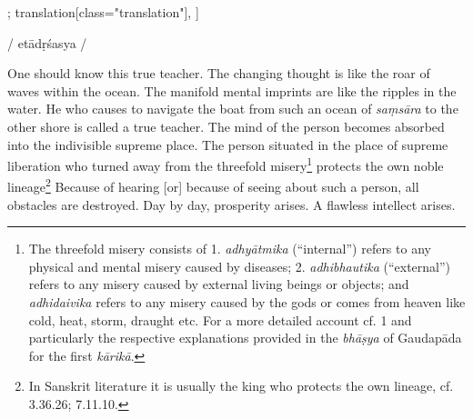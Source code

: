 \begin{alignment}[
  texts=edition[class="edition"];
  translation[class="translation"],
  ]
\begin{edition}
\begin{prose}[p58_01]
{  }
/
etādṛśasya
/
\end{prose}
  \end{edition}
  \begin{translation}
    \begin{tlate}[p57_04]
      \noindent
One should know this true teacher. The changing thought is like the roar of waves within the ocean. The manifold mental imprints are like the ripples in the water. He who causes to navigate the boat from such an ocean of \textit{saṃsāra} to the other shore is called a true teacher. The mind of the person becomes absorbed into the indivisible supreme place. The person situated in the place of supreme liberation who turned away from the threefold misery\footnote{The threefold misery consists of 1. \textit{adhyātmika} (``internal'') refers to any physical and mental misery caused by diseases; 2. \textit{adhibhautika} (``external'') refers to any misery caused by external living beings or objects; and \textit{adhidaivika} refers to any misery caused by the gods or comes from heaven like cold, heat, storm, draught etc. For a more detailed account cf.  1 and particularly the respective explanations provided in the \textit{bhāṣya} of Gaudapāda for the first \textit{kārikā}.} protects the own noble lineage\footnote{In Sanskrit literature it is usually the king who protects the own lineage, cf.  3.36.26;  7.11.10.} Because of hearing [or] because of seeing about such a person, all obstacles are destroyed. Day by day, prosperity arises. A flawless intellect arises.

\end{tlate}
\end{translation}
\end{alignment}
